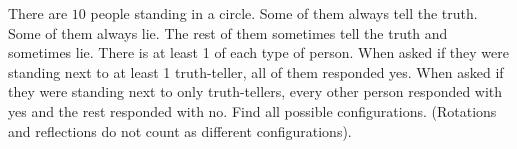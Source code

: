 There are $10$ people standing in a circle. Some of them always tell the truth. Some of them always lie. The rest of them sometimes tell the truth and sometimes lie. There is at least 1 of each type of person. When asked if they were standing next to at least 1 truth-teller, all of them responded yes. When asked if they were standing next to only truth-tellers, every other person responded with yes and the rest responded with no. Find all possible configurations. (Rotations and reflections do not count as different configurations).
